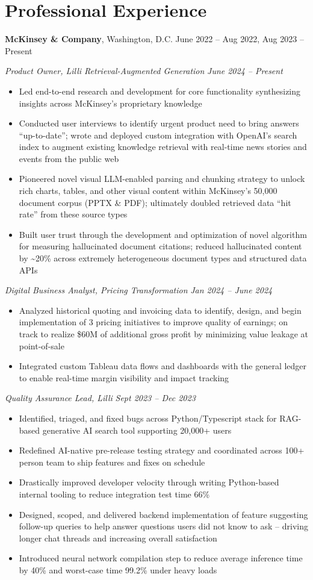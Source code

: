 \documentclass[10.5pt]{article}
\newcommand{\postlinebreakspacing} {
  \vspace{0.4ex}
}
\newcommand{\roleheader}[3]{
  \postlinebreakspacing
  \textbf{#1}, #2 \hfill #3
}
\newcommand{\role}[4]{
  \roleheader{#1}{#2}{#3}

  #4
}
\newcommand{\subrole}[5]{
  \vspace{0.1ex}
  \textit{#1, #2} \hfill \textit{#3 -- #4}

  \begin{itemize}
    #5
  \end{itemize}
}
\begin{document}
\section*{Professional Experience}
\role
{McKinsey \& Company}
{Washington, D.C.}
{June 2022 -- Aug 2022, Aug 2023 -- Present}
{
	\subrole
	{Product Owner}
	{Lilli Retrieval-Augmented Generation}
	{June 2024} {Present}
	{
		\item Led end-to-end research and development for core functionality synthesizing insights across McKinsey's proprietary knowledge
		\item Conducted user interviews to identify urgent product need to bring answers ``up-to-date''; wrote and deployed custom integration with OpenAI's search index to augment existing knowledge retrieval with real-time news stories and events from the public web
		\item Pioneered novel visual LLM-enabled parsing and chunking strategy to unlock rich charts, tables, and other visual content within McKinsey's 50,000 document corpus (PPTX \& PDF); ultimately doubled retrieved data ``hit rate'' from these source types
		\item Built user trust through the development and optimization of novel algorithm for measuring hallucinated document citations; reduced hallucinated content by \textasciitilde20\% across extremely heterogeneous document types and structured data APIs
	}

	\subrole
	{Digital Business Analyst}
	{Pricing Transformation}
	{Jan 2024}
	{June 2024}
	{
		\item Analyzed historical quoting and invoicing data to identify, design, and begin implementation of 3 pricing initiatives to improve quality of earnings; on track to realize \$60M of additional gross profit by minimizing value leakage at point-of-sale
		\item Integrated custom Tableau data flows and dashboards with the general ledger to enable real-time margin visibility and impact tracking
	}

	\subrole
	{Quality Assurance Lead}
	{Lilli}
	{Sept 2023}
	{Dec 2023}
	{
		\item Identified, triaged, and fixed bugs across Python/Typescript stack for RAG-based generative AI search tool supporting 20,000+ users
		\item Redefined AI-native pre-release testing strategy and coordinated across 100+ person team to ship features and fixes on schedule
		\item Drastically improved developer velocity through writing Python-based internal tooling to reduce integration test time 66\%
		\item Designed, scoped, and delivered backend implementation of feature suggesting follow-up queries to help answer questions users did not know to ask – driving longer chat threads and increasing overall satisfaction
		\item Introduced neural network compilation step to reduce average inference time by 40\% and worst-case time 99.2\% under heavy loads
	}


}
\end{document}
